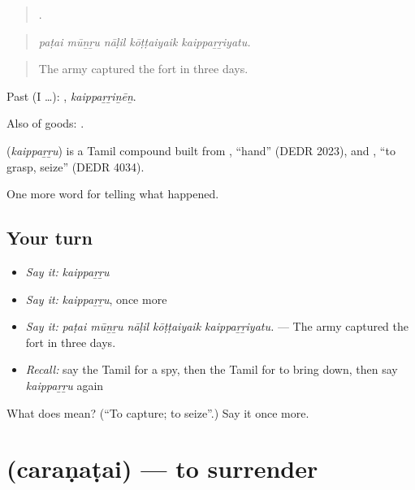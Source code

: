 \begin{quote}
    .
\end{quote}

\begin{quote}
\emph{paṭai mūṉṟu nāḷil kōṭṭaiyaik kaippaṟṟiyatu.}
\end{quote}

\begin{quote}
The army captured the fort in three days.
\end{quote}

Past (I …): , \emph{kaippaṟṟiṉēṉ}.

Also of goods:   .

\begin{cousinweb}
\textbf{} (\emph{kaippaṟṟu}) is a Tamil compound built from , \textquotedblleft{}hand\textquotedblright{} (DEDR 2023), and , \textquotedblleft{}to grasp, seize\textquotedblright{} (DEDR 4034).
\end{cousinweb}

\begin{grammarlens}[title={What you've built}]
One more word for telling what happened.
\end{grammarlens}

\subsection*{Your turn}
\begin{itemize}
\raggedright
  \item \emph{Say it:} \emph{kaippaṟṟu}
  \item \emph{Say it:} \emph{kaippaṟṟu}, once more
  \item \emph{Say it:} \emph{paṭai mūṉṟu nāḷil kōṭṭaiyaik kaippaṟṟiyatu.} — The army captured the fort in three days.
  \item \emph{Recall:} say the Tamil for a spy, then the Tamil for to bring down, then say \emph{kaippaṟṟu} again
\end{itemize}

\begin{tcolorbox}[breakable,colback=teal!4,colframe=teal!35!black,title={Before you move on}]
What does  mean? (\textquotedblleft{}To capture; to seize\textquotedblright{}.) Say it once more.
\end{tcolorbox}
\section[\texorpdfstring{\ta{சரணடை} (caraṇaṭai)}{சரணடை (caraṇaṭai)}]{ (caraṇaṭai) — to surrender}

